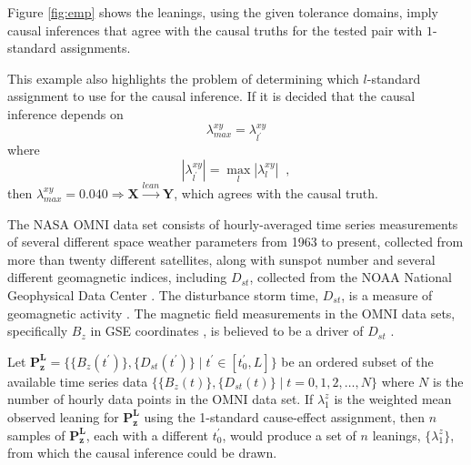 \documentclass[twocolumn,aps,pre,groupedaddress]{revtex4-1}
\begin{document}
Figure \ref{fig:emp} shows the leanings, using the given tolerance domains, imply causal inferences that agree with the causal truths for the tested pair with $1$-standard assignments.    

This example also highlights the problem of determining which $l$-standard assignment to use for the causal inference.  If it is decided that the causal inference depends on
\begin{equation}
\lambda^{xy}_{max} = \lambda^{xy}_{l^\prime}
\end{equation}
where
\begin{equation}
|\lambda^{xy}_{l^\prime}| = \max_l |\lambda^{xy}_l|\;\;,
\end{equation}
then $\lambda^{xy}_{max}=0.040\Rightarrow\mathbf{X}\xrightarrow{lean}\mathbf{Y}$, which agrees with the causal truth.   

The NASA OMNI data set consists of hourly-averaged time series measurements of several different space weather parameters from 1963 to present, collected from more than twenty different satellites, along with sunspot number and several different geomagnetic indices, including $D_{st}$, collected from the NOAA National Geophysical Data Center \cite{King2005}.  The disturbance storm time, $D_{st}$, is a measure of geomagnetic activity \cite{IAGA}.  The magnetic field measurements in the OMNI data sets, specifically $B_z$ in GSE coordinates \cite{Hapgood1992}, is believed to be a driver of $D_{st}$ \cite{Gonz1994}.

Let $\mathbf{P_{z}^L}=\{\{B_z(t^\prime)\},\{D_{st}(t^\prime)\}\;|\;t^\prime\in[t^\prime_0,L]\}$ be an ordered subset of the available time series data $\{\{B_z(t)\},\{D_{st}(t)\}\;|\;t=0,1,2,\ldots,N\}$ where $N$ is the number of hourly data points in the OMNI data set.  If $\lambda_1^{z}$ is the weighted mean observed leaning for $\mathbf{P_{z}^L}$ using the 1-standard cause-effect assignment, then $n$ samples of $\mathbf{P_{z}^L}$, each with a different $t^\prime_0$,  would produce a set of $n$ leanings, $\{\lambda_1^{z}\}$, from which the causal inference could be drawn.
\end{document}
